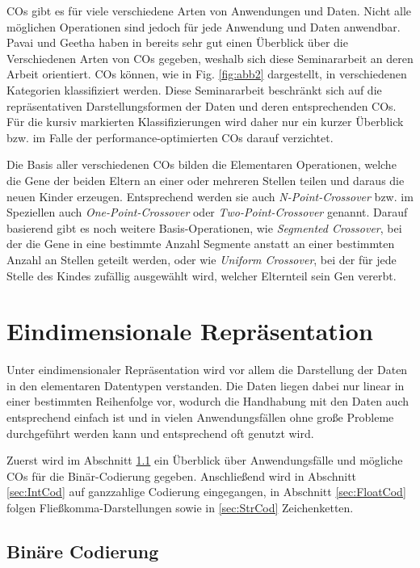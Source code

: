 \documentclass{llncs}
\begin{document}
	COs gibt es für viele verschiedene Arten von Anwendungen und Daten. Nicht alle möglichen Operationen sind jedoch für jede Anwendung und Daten anwendbar. Pavai und Geetha haben in \cite{Survey} bereits sehr gut einen Überblick über die Verschiedenen Arten von COs gegeben, weshalb sich diese Seminararbeit an deren Arbeit orientiert. COs können, wie in Fig. \ref{fig:abb2} dargestellt, in verschiedenen Kategorien klassifiziert werden. Diese Seminararbeit beschränkt sich auf die repräsentativen Darstellungsformen der Daten und deren entsprechenden COs. Für die kursiv markierten Klassifizierungen wird daher nur ein kurzer Überblick bzw. im Falle der performance-optimierten COs darauf verzichtet.

	Die Basis aller verschiedenen COs bilden die Elementaren Operationen, welche die Gene der beiden Eltern an einer oder mehreren Stellen teilen und daraus die neuen Kinder erzeugen. Entsprechend werden sie auch \textit{N-Point-Crossover} bzw. im Speziellen auch \textit{One-Point-Crossover} oder \textit{Two-Point-Crossover} genannt. Darauf basierend gibt es noch weitere Basis-Operationen, wie \textit{Segmented Cross\-over}, bei der die Gene in eine bestimmte Anzahl Segmente anstatt an einer bestimmten Anzahl an Stellen geteilt werden\cite{GABasicIdeas}, oder wie \textit{Uniform Crossover}, bei der für jede Stelle des Kindes zufällig ausgewählt wird, welcher Elternteil sein Gen vererbt.

\section{Eindimensionale Repräsentation}
\label{sec:EindimensionaleRep}

	Unter eindimensionaler Repräsentation wird vor allem die Darstellung der Daten in den elementaren Datentypen verstanden. Die Daten liegen dabei nur linear in einer bestimmten Reihenfolge vor, wodurch die Handhabung mit den Daten auch entsprechend einfach ist und in vielen Anwendungsfällen ohne große Probleme durchgeführt werden kann und entsprechend oft genutzt wird.
	
	Zuerst wird im Abschnitt \ref{sec:BinCod} ein Überblick über Anwendungsfälle und mög\-liche COs für die Binär-Codierung gegeben. Anschließend wird in Abschnitt \ref{sec:IntCod} auf ganzzahlige Codierung eingegangen, in Abschnitt \ref{sec:FloatCod} folgen Fließkomma-Darstellungen sowie in \ref{sec:StrCod} Zeichenketten.

	\subsection{Binäre Codierung}
	\label{sec:BinCod}
	
\end{document}
